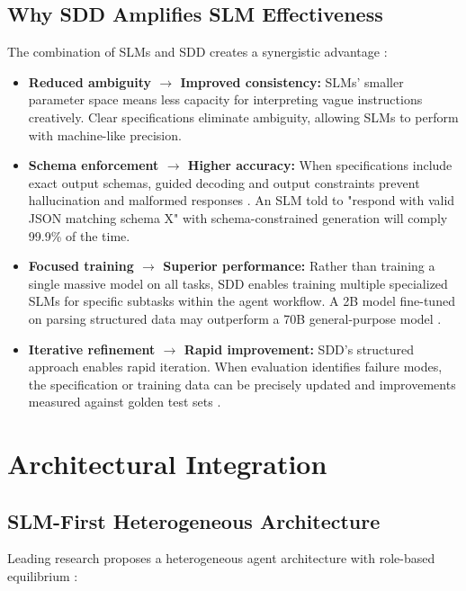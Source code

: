 \documentclass[11pt,a4paper]{article}
\begin{document}
\subsection{Why SDD Amplifies SLM Effectiveness}

The combination of SLMs and SDD creates a synergistic advantage \cite{nvidia2025}\cite{jetbrains2025}:\newline
\begin{itemize}
\item \textbf{Reduced ambiguity $\rightarrow$ Improved consistency:} SLMs' smaller parameter space means less capacity for interpreting vague instructions creatively. Clear specifications eliminate ambiguity, allowing SLMs to perform with machine-like precision.
\item \textbf{Schema enforcement $\rightarrow$ Higher accuracy:} When specifications include exact output schemas, guided decoding and output constraints prevent hallucination and malformed responses \cite{nvidia2025}. An SLM told to "respond with valid JSON matching schema X" with schema-constrained generation will comply 99.9\% of the time.
\item \textbf{Focused training $\rightarrow$ Superior performance:} Rather than training a single massive model on all tasks, SDD enables training multiple specialized SLMs for specific subtasks within the agent workflow. A 2B model fine-tuned on parsing structured data may outperform a 70B general-purpose model \cite{nvidia2025}.
\item \textbf{Iterative refinement $\rightarrow$ Rapid improvement:} SDD's structured approach enables rapid iteration. When evaluation identifies failure modes, the specification or training data can be precisely updated and improvements measured against golden test sets \cite{nvidia2025}.
\end{itemize}
\section{Architectural Integration}

\subsection{SLM-First Heterogeneous Architecture}
Leading research proposes a heterogeneous agent architecture with role-based equilibrium \cite{nvidia2025}:
\end{document}
